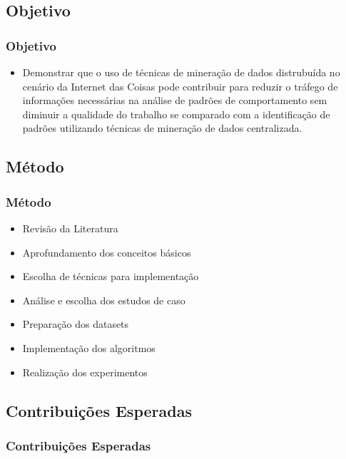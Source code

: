 \documentclass[hyperref={pdfpagelabels=false}]{beamer}
\begin{document}
\subsection{Objetivo}
 
\begin{frame}
	\frametitle{Objetivo}

	\begin{itemize}
		\item Demonstrar que o uso de t\'{e}cnicas de minera\c{c}\~{a}o de dados distrubu\'{i}da no cenário da Internet das Coisas pode contribuir para reduzir o tráfego de informações necessárias na análise de padrões de comportamento sem diminuir a qualidade do trabalho se comparado com a identificação de padrões utilizando técnicas de mineração de dados centralizada. 
	\end{itemize}

\end{frame}

\subsection{Método}  

\begin{frame}
	\frametitle{Método}
     \begin{itemize}
        	\item Revisão da Literatura
            \item Aprofundamento dos conceitos básicos
            \item Escolha de técnicas para implementação
            \item Análise e escolha dos estudos de caso
            \item Preparação dos datasets
            \item Implementação dos algoritmos
            \item Realização dos experimentos
		\end{itemize}

\end{frame}
    
\subsection{Contribuições Esperadas}  

\begin{frame}
	\frametitle{Contribuições Esperadas}

\end{frame}
   
\end{document}
